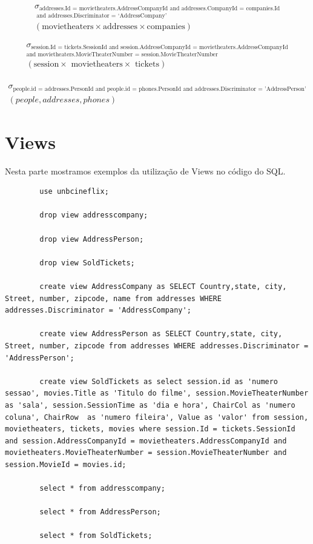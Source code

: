 \documentclass[a4paper,10pt]{article}
\begin{document}
\begin{eqnarray*}
\sigma_{\textrm{addresses.Id = movietheaters.AddressCompanyId and addresses.CompanyId = companies.Id}}\\
_{\textrm{ and addresses.Discriminator = `AddressCompany'}}\\
(\textrm{movietheaters} \times \textrm{addresses} \times \textrm{companies})
\end{eqnarray*}

\begin{eqnarray*}
\sigma_{\textrm{session.Id = tickets.SessionId and session.AddressCompanyId = movietheaters.AddressCompanyId}}\\
_{ \textrm{and movietheaters.MovieTheaterNumber = session.MovieTheaterNumber}}\\
(\textrm{session} \times \textrm{ movietheaters} \times \textrm{ tickets})\\
\end{eqnarray*}

\begin{eqnarray}
\sigma_{ \textrm{people.id = addresses.PersonId and people.id = phones.PersonId and addresses.Discriminator = 'AddressPerson'}}\\
(people, addresses,phones)
\end{eqnarray}

\section{Views}

Nesta parte mostramos exemplos da utilização de Views no código do SQL.

\begin{lstlisting}
		use unbcineflix;

		drop view addresscompany;

		drop view AddressPerson;

		drop view SoldTickets;

		create view AddressCompany as SELECT Country,state, city, Street, number, zipcode, name from addresses WHERE addresses.Discriminator = 'AddressCompany';

		create view AddressPerson as SELECT Country,state, city, Street, number, zipcode from addresses WHERE addresses.Discriminator = 'AddressPerson';

		create view SoldTickets as select session.id as 'numero sessao', movies.Title as 'Titulo do filme', session.MovieTheaterNumber as 'sala', session.SessionTime as 'dia e hora', ChairCol as 'numero coluna', ChairRow  as 'numero fileira', Value as 'valor' from session, movietheaters, tickets, movies where session.Id = tickets.SessionId and session.AddressCompanyId = movietheaters.AddressCompanyId and movietheaters.MovieTheaterNumber = session.MovieTheaterNumber and session.MovieId = movies.id;

		select * from addresscompany;

		select * from AddressPerson;

		select * from SoldTickets;
\end{lstlisting}
\end{document}
